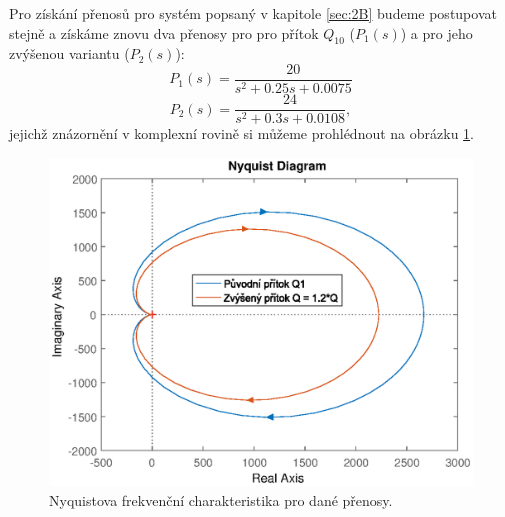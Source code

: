 \documentclass[a4paper,11pt]{article}
\begin{document}
\newpage 
Pro získání přenosů pro systém popsaný v kapitole \ref{sec:2B} budeme postupovat stejně a získáme znovu dva přenosy pro pro přítok $ Q_{10} $ ($ P_{1}\left ( s \right )  $) a pro jeho zvýšenou variantu ($ P_{2}\left ( s \right )  $):
\begin{equation}\label{eq:P-B1} 
P_{1}\left ( s \right ) =\frac{20}{s^{2} + 0.25 s + 0.0075}
\end{equation}
\begin{equation}\label{eq:P-B2} 
P_{2}\left ( s \right ) =\frac{24}{s^{2} + 0.3  s + 0.0108},
\end{equation}
jejichž znázornění v komplexní rovině si můžeme prohlédnout na obrázku \ref{fig:nyquist-B}.
\begin{figure}[htbp]
	\begin{center}
	\includegraphics[scale = 1.0]{obrazky/nyquistB.eps}
	\end{center}
	\caption{Nyquistova frekvenční charakteristika pro dané přenosy.}
	\label{fig:nyquist-B}
\end{figure}

\newpage 
\end{document}
